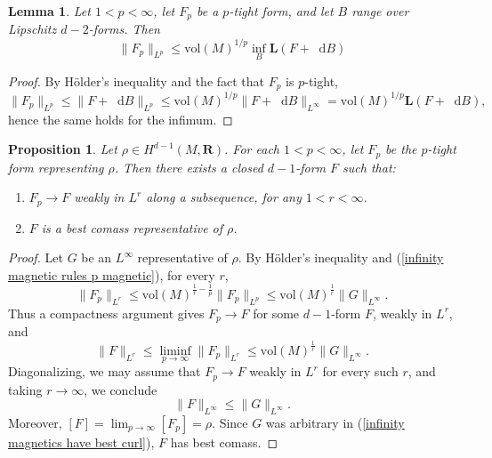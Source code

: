 \documentclass[reqno,11pt]{amsart}
\newcommand{\RR}{\mathbf{R}}
\newcommand*\dif{\mathop{}\!\mathrm{d}}
\newcommand{\vol}{\mathrm{vol}}
\newcommand{\Comass}{\mathbf L}
\newtheorem{lemma}[theorem]{Lemma}
\newtheorem{proposition}[theorem]{Proposition}
\theoremstyle{definition}
\numberwithin{equation}{section}
\begin{document}
\begin{lemma}
Let $1 < p < \infty$, let $F_p$ be a $p$-tight form, and let $B$ range over Lipschitz $d - 2$-forms. Then
\begin{equation}\label{infinity magnetic rules p magnetic}
	\|F_p\|_{L^p} \leq \vol(M)^{1/p} \inf_B \Comass(F + \dif B)
\end{equation}
\end{lemma}
\begin{proof}
By H\"older's inequality and the fact that $F_p$ is $p$-tight,
$$\|F_p\|_{L^p} \leq \|F + \dif B\|_{L^p} \leq \vol(M)^{1/p} \|F + \dif B\|_{L^\infty} = \vol(M)^{1/p} \Comass(F + \dif B),$$
hence the same holds for the infimum.
\end{proof}

\begin{proposition}\label{existence infinity}
Let $\rho \in H^{d - 1}(M, \RR)$.
For each $1 < p < \infty$, let $F_p$ be the $p$-tight form representing $\rho$.
Then there exists a closed $d - 1$-form $F$ such that:
\begin{enumerate}
\item $F_p \to F$ weakly in $L^r$ along a subsequence, for any $1 < r < \infty$.
\item $F$ is a best comass representative of $\rho$.
\end{enumerate}
\end{proposition}
\begin{proof}
Let $G$ be an $L^\infty$ representative of $\rho$.
By H\"older's inequality and (\ref{infinity magnetic rules p magnetic}), for every $r$,
\begin{equation}\label{uniform bounds in p by best curl}
	\|F_p\|_{L^r} \leq \vol(M)^{\frac{1}{r} - \frac{1}{p}} \|F_p\|_{L^p} \leq \vol(M)^{\frac{1}{r}} \|G\|_{L^\infty}.
\end{equation}
Thus a compactness argument gives $F_p \to F$ for some $d - 1$-form $F$, weakly in $L^r$, and 
$$\|F\|_{L^r} \leq \liminf_{p \to \infty} \|F_p\|_{L^r} \leq \vol(M)^{\frac{1}{r}} \|G\|_{L^\infty}.$$
Diagonalizing, we may assume that $F_p \to F$ weakly in $L^r$ for every such $r$, and taking $r \to \infty$, we conclude 
\begin{equation}\label{infinity magnetics have best curl}
	\|F\|_{L^\infty} \leq \|G\|_{L^\infty}.
\end{equation}
Moreover, $[F] = \lim_{p \to \infty} [F_p] = \rho$.
Since $G$ was arbitrary in (\ref{infinity magnetics have best curl}), $F$ has best comass.
\end{proof}
\end{document}
